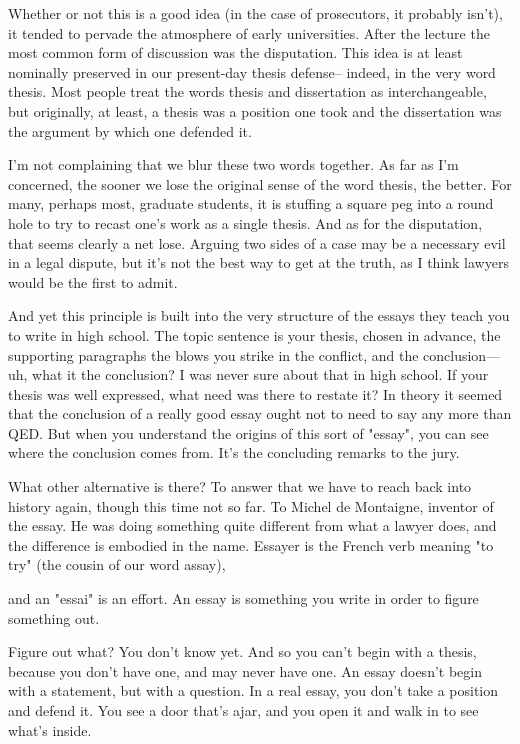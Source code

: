Whether or not this is a good idea (in the case of prosecutors,
it probably isn't), it tended to pervade
the atmosphere of
early universities.  After the lecture the most common form
of discussion was the disputation.  This idea
is at least
nominally preserved in our present-day thesis defense-- indeed,
in the very word thesis.  Most people treat the words 
thesis
and dissertation as interchangeable, but originally, at least,
a thesis was a position one took and the dissertation was
the argument by which one defended it.

I'm not complaining that we blur these two words together.
As far as I'm concerned, the sooner we lose the original
sense of the word thesis, the better.  For many, perhaps most,  
graduate students, it is stuffing a square peg into a round
hole to try to recast one's work as a single thesis.  And
as for the disputation, that seems clearly a net lose.
Arguing two sides of a case may be a necessary evil in a
legal dispute, but it's not the best way to get at the truth,
as I think lawyers would be the first to admit.


And yet this principle is built into the very structure of  
the essays
they teach you to write in high school.  The topic
sentence is your thesis, chosen in advance, the supporting 
paragraphs the blows you strike in the conflict, and the
conclusion--- uh, what it the conclusion?  I was never sure  
about that in high school.  If your thesis was well expressed,
what need was there to restate it?  In theory it seemed that
the conclusion of a really good essay ought not to need to   
say any more than QED.
But when you understand the origins
of this sort of "essay", you can see where the
conclusion comes from.  It's the concluding remarks to the 
jury.


What other alternative is there?  To answer that
we have to
reach back into history again, though this time not so far.
To Michel de Montaigne, inventor of the essay.
He was
doing something quite different from what a
lawyer does,
and
the difference is embodied in the name.  Essayer is the French
verb meaning "to try" (the cousin of our word assay),

and an "essai" is an effort.
An essay is something you
write in order
to figure something out.

Figure out what?  You don't know yet.  And so you can't begin with a
thesis, because you don't have one, and may never have 
one.  An essay doesn't begin with a statement, but with a  
question.  In a real essay, you don't take a position and
defend it.  You see a door that's ajar, and you open it and
walk in to see what's inside.

